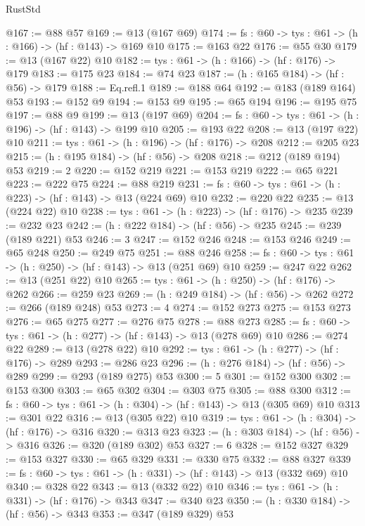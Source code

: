 \begin{lexlean}{RustStd}
\begin{coremodule}
@167 := @88 @57
@169 := @13 (@167 @69)
@174 := {fs : @60} -> {tys : @61} -> (h : @166) -> (hf : @143) -> @169 @10
@175 := @163 @22
@176 := @55 @30
@179 := @13 (@167 @22) @10
@182 := {tys : @61} -> (h : @166) -> (hf : @176) -> @179
@183 := @175 @23
@184 := @74 @23
@187 := (h : @165 @184) -> (hf : @56) -> @179
@188 := Eq.refl.{1}
@189 := @188 @64
@192 := @183 (@189 @164) @53
@193 := @152 @9
@194 := @153 @9
@195 := @65 @194
@196 := @195 @75
@197 := @88 @9
@199 := @13 (@197 @69)
@204 := {fs : @60} -> {tys : @61} -> (h : @196) -> (hf : @143) -> @199 @10
@205 := @193 @22
@208 := @13 (@197 @22) @10
@211 := {tys : @61} -> (h : @196) -> (hf : @176) -> @208
@212 := @205 @23
@215 := (h : @195 @184) -> (hf : @56) -> @208
@218 := @212 (@189 @194) @53
@219 := 2
@220 := @152 @219
@221 := @153 @219
@222 := @65 @221
@223 := @222 @75
@224 := @88 @219
@231 := {fs : @60} -> {tys : @61} -> (h : @223) -> (hf : @143) -> @13 (@224 @69) @10
@232 := @220 @22
@235 := @13 (@224 @22) @10
@238 := {tys : @61} -> (h : @223) -> (hf : @176) -> @235
@239 := @232 @23
@242 := (h : @222 @184) -> (hf : @56) -> @235
@245 := @239 (@189 @221) @53
@246 := 3
@247 := @152 @246
@248 := @153 @246
@249 := @65 @248
@250 := @249 @75
@251 := @88 @246
@258 := {fs : @60} -> {tys : @61} -> (h : @250) -> (hf : @143) -> @13 (@251 @69) @10
@259 := @247 @22
@262 := @13 (@251 @22) @10
@265 := {tys : @61} -> (h : @250) -> (hf : @176) -> @262
@266 := @259 @23
@269 := (h : @249 @184) -> (hf : @56) -> @262
@272 := @266 (@189 @248) @53
@273 := 4
@274 := @152 @273
@275 := @153 @273
@276 := @65 @275
@277 := @276 @75
@278 := @88 @273
@285 := {fs : @60} -> {tys : @61} -> (h : @277) -> (hf : @143) -> @13 (@278 @69) @10
@286 := @274 @22
@289 := @13 (@278 @22) @10
@292 := {tys : @61} -> (h : @277) -> (hf : @176) -> @289
@293 := @286 @23
@296 := (h : @276 @184) -> (hf : @56) -> @289
@299 := @293 (@189 @275) @53
@300 := 5
@301 := @152 @300
@302 := @153 @300
@303 := @65 @302
@304 := @303 @75
@305 := @88 @300
@312 := {fs : @60} -> {tys : @61} -> (h : @304) -> (hf : @143) -> @13 (@305 @69) @10
@313 := @301 @22
@316 := @13 (@305 @22) @10
@319 := {tys : @61} -> (h : @304) -> (hf : @176) -> @316
@320 := @313 @23
@323 := (h : @303 @184) -> (hf : @56) -> @316
@326 := @320 (@189 @302) @53
@327 := 6
@328 := @152 @327
@329 := @153 @327
@330 := @65 @329
@331 := @330 @75
@332 := @88 @327
@339 := {fs : @60} -> {tys : @61} -> (h : @331) -> (hf : @143) -> @13 (@332 @69) @10
@340 := @328 @22
@343 := @13 (@332 @22) @10
@346 := {tys : @61} -> (h : @331) -> (hf : @176) -> @343
@347 := @340 @23
@350 := (h : @330 @184) -> (hf : @56) -> @343
@353 := @347 (@189 @329) @53

\end{coremodule}
\end{lexlean}
